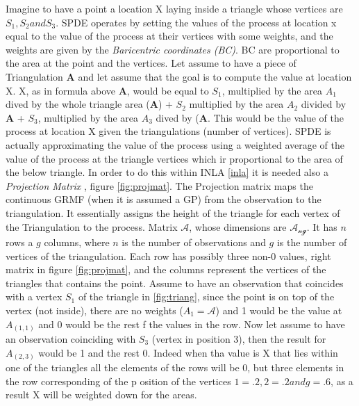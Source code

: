 \documentclass[
  12pt,
  a4paper,
  oneside]{book}
\theoremstyle{definition}
\theoremstyle{definition}
\theoremstyle{definition}
\theoremstyle{remark}
\begin{document}
Imagine to have a point a location X laying inside a triangle whose vertices are \(S_1, S_2 and S_3\). SPDE operates by setting the values of the process at location x equal to the value of the process at their vertices with some weights, and the weights are given by the \emph{Baricentric coordinates (BC)}. BC are proportional to the area at the point and the vertices. Let assume to have a piece of Triangulation \(\boldsymbol{A}\) and let assume that the goal is to compute the value at location X. X, as in formula above \(\boldsymbol{A}\), would be equal to \(S_1\), multiplied by the area \(A_1\) dived by the whole triangle area (\(\boldsymbol{A}\)) + \(S_2\) multiplied by the area \(A_2\) divided by \(\boldsymbol{A}\) + \(S_3\), multiplied by the area \(A_3\) dived by (\(\boldsymbol{A}\). This would be the value of the process at location X given the triangulations (number of vertices). SPDE is actually approximating the value of the process using a weighted average of the value of the process at the triangle vertices which ir proportional to the area of the below triangle.
In order to do this within INLA \ref{inla} it is needed also a \emph{Projection Matrix} , figure \ref{fig:projmat}. The Projection matrix maps the continuous GRMF (when it is assumed a GP) from the observation to the triangulation. It essentially assigns the height of the triangle for each vertex of the Triangulation to the process. Matrix \(\mathcal{A}\), whose dimensions are \(\mathcal{A_{ng}}\). It has \(n\) rows a \(g\) columns, where \(n\) is the number of observations and \(g\) is the number of vertices of the triangulation. Each row has possibly three non-0 values, right matrix in figure \ref{fig:projmat}, and the columns represent the vertices of the triangles that contains the point. Assume to have an observation that coincides with a vertex \(S_1\) of the triangle in \ref{fig:triang}, since the point is on top of the vertex (not inside), there are no weights (\(A_1 = \mathcal{A}\)) and 1 would be the value at \(A_{(1,1)}\) and 0 would be the rest f the values in the row. Now let assume to have an observation coinciding with \(S_3\) (vertex in position 3), then the result for \(A_{(2,3)}\) would be 1 and the rest 0. Indeed when tha value is X that lies within one of the triangles all the elements of the rows will be 0, but three elements in the row corresponding of the p osition of the vertices \(1 = .2, 2 = .2 and g = .6\), as a result X will be weighted down for the areas.
\end{document}
